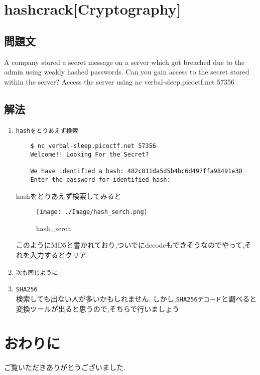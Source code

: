 \documentclass[dvipdfmx]{jsarticle}
\begin{document}
\section{hashcrack[Cryptography]}
\subsection{問題文}
A company stored a secret message on a server which got breached due to the admin using weakly hashed passwords. Can you gain access to the secret stored within the server? Access the server using nc verbal-sleep.picoctf.net 57356

\subsection{解法}
\begin{enumerate}
	\item \texttt{hashをとりあえず検索}
	\begin{verbatim}
	$ nc verbal-sleep.picoctf.net 57356
	Welcome!! Looking For the Secret?

	We have identified a hash: 482c811da5d5b4bc6d497ffa98491e38
	Enter the password for identified hash: 
	\end{verbatim}
	hashをとりあえず検索してみると
	\begin{figure}[h]
	\begin{center}
	\texttt{[image: ./Image/hash\_serch.png]}
	\caption{hash\_serch}
	\end{center}
	\end{figure}
	\FloatBarrier
	このようにMD5と書かれており,ついでにdecodeもできそうなのでやって,それを入力するとクリア
	\item \texttt{次も同じように}
	\item \texttt{SHA256}\\
	検索しても出ない人が多いかもしれません.
	しかし,\texttt{SHA256デコード}と調べると変換ツールが出ると思うので,そちらで行いましょう

\end{enumerate}


\section{おわりに}
ご覧いただきありがとうございました.
\end{document}
